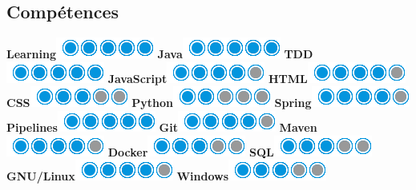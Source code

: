 \documentclass[]{friggeri-cv}
\begin{document}
\begin{aside}
  \section{Compétences}
  \hspace{1cm}
    \textbf{Learning}\includegraphics[scale=0.40]{img/5puces.png}
    \textbf{Java}\includegraphics[scale=0.40]{img/5puces.png}
    \textbf{TDD}\includegraphics[scale=0.40]{img/5puces.png}
    \textbf{JavaScript}\includegraphics[scale=0.40]{img/4puces.png}
    \textbf{HTML}\includegraphics[scale=0.40]{img/4puces.png}
    \textbf{CSS}\includegraphics[scale=0.40]{img/3puces.png}
    \textbf{Python}\includegraphics[scale=0.40]{img/2puces.png}
    \textbf{Spring}\includegraphics[scale=0.40]{img/4puces.png}
    \textbf{Pipelines}\includegraphics[scale=0.40]{img/5puces.png}
    \textbf{Git}\includegraphics[scale=0.40]{img/4puces.png}
    \textbf{Maven}\includegraphics[scale=0.40]{img/4puces.png}
    \textbf{Docker}\includegraphics[scale=0.40]{img/3puces.png}
    \textbf{SQL}\includegraphics[scale=0.40]{img/3puces.png}
    \textbf{GNU/Linux}\includegraphics[scale=0.40]{img/4puces.png}
    \textbf{Windows}\includegraphics[scale=0.40]{img/3puces.png}
    ~

\end{aside}
\end{document}
